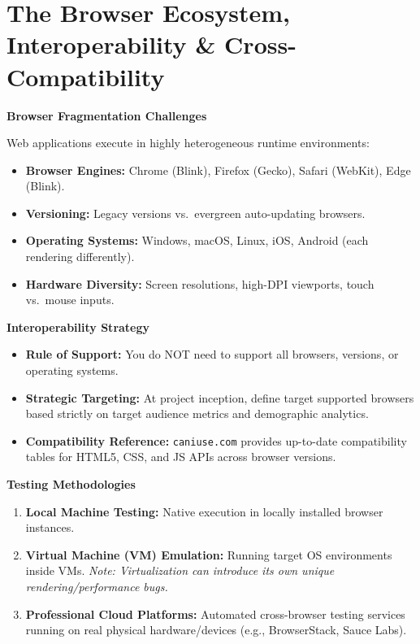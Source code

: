 \documentclass[8pt, a4paper]{article}
\begin{document}
\section{The Browser Ecosystem, Interoperability \& Cross-Compatibility}

\begin{conceptbox}
\textbf{Browser Fragmentation Challenges}

Web applications execute in highly heterogeneous runtime environments:
\begin{itemize}
  \item \textbf{Browser Engines:} Chrome (Blink), Firefox (Gecko), Safari (WebKit), Edge (Blink).
  \item \textbf{Versioning:} Legacy versions vs.\ evergreen auto-updating browsers.
  \item \textbf{Operating Systems:} Windows, macOS, Linux, iOS, Android (each rendering differently).
  \item \textbf{Hardware Diversity:} Screen resolutions, high-DPI viewports, touch vs.\ mouse inputs.
\end{itemize}
\end{conceptbox}

\begin{conceptbox}
\textbf{Interoperability Strategy}
\begin{itemize}
  \item \textbf{Rule of Support:} You do NOT need to support all browsers, versions, or operating systems.
  \item \textbf{Strategic Targeting:} At project inception, define target supported browsers based strictly
        on target audience metrics and demographic analytics.
  \item \textbf{Compatibility Reference:} \texttt{caniuse.com} provides up-to-date compatibility tables for
        HTML5, CSS, and JS APIs across browser versions.
\end{itemize}
\end{conceptbox}

\begin{conceptbox}
\textbf{Testing Methodologies}
\begin{enumerate}
  \item \textbf{Local Machine Testing:} Native execution in locally installed browser instances.
  \item \textbf{Virtual Machine (VM) Emulation:} Running target OS environments inside VMs.
        \textit{Note: Virtualization can introduce its own unique rendering/performance bugs.}
  \item \textbf{Professional Cloud Platforms:} Automated cross-browser testing services running on real
        physical hardware/devices (e.g., BrowserStack, Sauce Labs).
\end{enumerate}
\end{conceptbox}
\end{document}
